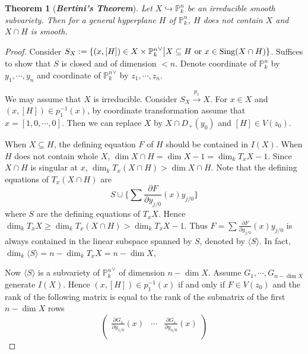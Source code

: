 \documentclass{ctexart}
\newtheorem{theorem}{Theorem}[section]
\newcommand{\singular}{\operatorname{Sing}}
\begin{document}
\begin{theorem}[\textbf{\emph{Bertini's Theorem}}]
    Let $X \hookrightarrow \mathbb{P}_{k}^{n}$ be an irreducible smooth subvariety.
    Then for a general hyperplane $H$ of $\mathbb{P}_{k}^{n}$, $H$ does not contain $X$ and $X \cap H$ is smooth.
    \label{Theorem 5.6}
\end{theorem}
\begin{proof}
    Consider $S_{X} := \{(x, [H])\in X \times {\mathbb{P}_{k}^{n}}^{\vee} \big{|} X \subseteq H \text{ or } x\in \singular(X \cap H)\}$.
    Suffices to show that $S$ is closed and of dimension $< n$.
    Denote coordinate of $\mathbb{P}_{k}^{n}$ by $y_{1}, \cdots, y_{n}$ and coordinate of ${\mathbb{P}_{k}^{n}}^{\vee}$ by $z_{1}, \cdots, z_{n}$.
    \par
    We may assume that $X$ is irreducible.
    Consider $S_{X} \overset{p_{1}}{\rightarrow} X$.
    For $x\in X$ and $(x, [H])\in p_{1}^{-1}(x)$, by coordinate transformation assume that $x = [1, 0, \cdots, 0]$.
    Then we can replace $X$ by $X \cap D_{+}(y_{0})$ and $[H]\in V(z_{0})$.
    \par 
    When $X \subseteq H$, the defining equation $F$ of $H$ should be contained in $I(X)$.
    When $H$ does not contain whole $X$, $\dim X \cap H = \dim X - 1 = \dim_{k} T_{x}X - 1$.
    Since $X \cap H$ is singular at $x$, $\dim_{k} T_{x}(X \cap H) > \dim X \cap H$.
    Note that the defining equations of $T_{x}(X \cap H)$ are
    \begin{equation}
        S \cup \{\sum \frac{\partial F}{\partial y_{j/0}}(x)y_{j/0}\}
    \end{equation}
    where $S$ are the defining equations of $T_{x}X$.
    Hence $\dim_{k} T_{x}X \ge \dim_{k} T_{x}(X \cap H) > \dim_{k} T_{x}X - 1$.
    Thus $F = \sum \frac{\partial F}{\partial y_{j/0}}(x)y_{j/0}$ is always contained in the linear subspace spanned by $S$, denoted by $\langle S \rangle$.
    In fact, $\dim_{k} \langle S \rangle = n - \dim_{k} T_{x}X = n - \dim X$,
    \par
    Now $\langle S \rangle$ is a subvariety of ${\mathbb{P}_{k}^{n}}^{\vee}$ of dimension $n - \dim X$.
    Assume $G_{1}, \cdots, G_{n - \dim X}$ generate $I(X)$.
    Hence $(x, [H])\in p_{1}^{-1}(x)$ if and only if $F\in V(z_{0})$ and the rank of the following matrix is equal to the rank of the submatrix of the first $n - \dim X$ rows
    \begin{equation}
        \begin{pmatrix}
            \frac{\partial G_{1}}{\partial y_{1/0}}(x) & \cdots & \frac{\partial G_{1}}{\partial y_{n/0}}(x) \\

\end{pmatrix}
\end{equation}
\end{proof}
\end{document}
